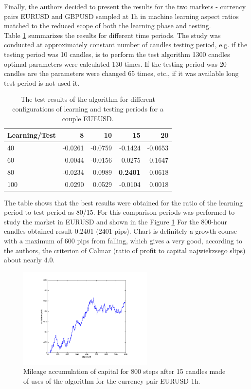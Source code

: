 \documentclass[runningheads,a4paper]{llncs}
\begin{document}
Finally, the authors decided to present the results for the two markets - currency pairs EURUSD and GBPUSD sampled at 1h in machine learning aspect ratios matched to the reduced scope of both the learning phase and testing.\\

Table \ref{tab:tab1} summarizes the results for different time periods. The study was conducted at approximately constant number of candles testing period, e.g. if the testing period was 10 candles, is to perform the test algorithm 1300 candles optimal parameters were calculated 130 times. If the testing period was 20 candles are the parameters were changed 65 times, etc., if it was available long test period is not used it.

\begin{table}[h!]
\centering
\caption{The test results of the algorithm for different configurations of learning and testing periods for a couple EUEUSD.}
\label{tab:tab1}
\begin{tabular}{|l|r|r|r|r|} \hline
Learning/Test &	8	 &	10 &		15	 &	20 \\ \hline
40 &		-0.0261 &		-0.0759	 &	-0.1424	 &	-0.0653 \\ \hline
60 &		0.0044 &		-0.0156 &		0.0275 &		0.1647 \\ \hline
80 &		-0.0234 &		0.0989 &		\textbf{0.2401} &		0.0618 \\ \hline
100	 &	0.0290 &		0.0529 &		-0.0104	 &	0.0018 \\ \hline
\end{tabular}
\end{table}
\FloatBarrier

The table shows that the best results were obtained for the ratio of the learning period to test period as 80/15. For this comparison periods was performed to study the market in EURUSD and shown in the Figure \ref{fig:fig8} For the 800-hour candles obtained result 0.2401 (2401 pips). Chart is definitely a growth course with a maximum of 600 pips from falling, which gives a very good, according to the authors, the criterion of Calmar (ratio of profit to capital najwiekzsego slips) about nearly 4.0.\\

\begin{figure}[h!]
\centering
\includegraphics[width = 0.6\textwidth]{figures/rys8.png}
\caption{Mileage accumulation of capital for 800 steps after 15 candles made of uses of the algorithm for the currency pair EURUSD 1h.}
\label{fig:fig8}
\end{figure}
\FloatBarrier
\end{document}
